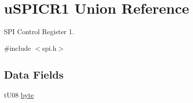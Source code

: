 \hypertarget{unionu_s_p_i_c_r1}{}\section{u\+S\+P\+I\+C\+R1 Union Reference}
\label{unionu_s_p_i_c_r1}


S\+P\+I Control Register 1.  




{\ttfamily \#include $<$spi.\+h$>$}

\subsection*{Data Fields}
\begin{DoxyCompactItemize}
\item 
\hypertarget{unionu_s_p_i_c_r1_aba308d63db050aed25cfd36c37e41ad4}{}t\+U08 \hyperlink{unionu_s_p_i_c_r1_aba308d63db050aed25cfd36c37e41ad4}{byte}\label{unionu_s_p_i_c_r1_aba308d63db050aed25cfd36c37e41ad4}


\end{DoxyCompactItemize}
